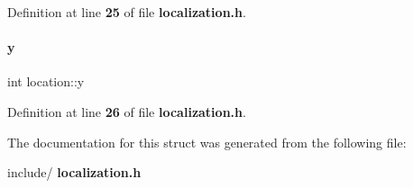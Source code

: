 Definition at line \textbf{ 25} of file \textbf{ localization.\+h}.

\mbox{\label{structlocation_ad7197d1981d4ea5d8b36041473cac815}} 
\paragraph{y}
{\footnotesize\ttfamily int location\+::y}



Definition at line \textbf{ 26} of file \textbf{ localization.\+h}.



The documentation for this struct was generated from the following file\+:\begin{DoxyCompactItemize}
\item 
include/\textbf{ localization.\+h}\end{DoxyCompactItemize}

